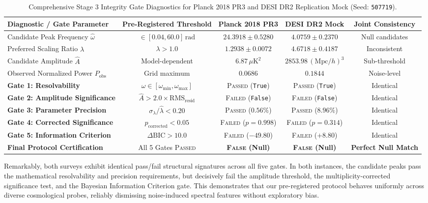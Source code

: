 \documentclass[10pt,twocolumn,a4paper]{article}
\begin{document}
\begin{table}[t]
\centering
\small
\caption{Comprehensive Stage 3 Integrity Gate Diagnostics for Planck 2018 PR3 and DESI DR2 Replication Mock (Seed: \texttt{507719}).}
\label{tab:gates}
\begin{tabular}{lcccc}
\toprule
\textbf{Diagnostic / Gate Parameter} & \textbf{Pre-Registered Threshold} & \textbf{Planck 2018 PR3} & \textbf{DESI DR2 Mock} & \textbf{Joint Consistency} \\
\midrule
Candidate Peak Frequency $\hat\omega$ & $\in [0.04, 60.0]\,\mathrm{rad}$ & $24.3918 \pm 0.5280$ & $4.0759 \pm 0.2370$ & Null candidates \\
Preferred Scaling Ratio $\hat\lambda$ & $\lambda > 1.0$ & $1.2938 \pm 0.0072$ & $4.6718 \pm 0.4187$ & Inconsistent \\
Candidate Amplitude $\hat A$ & Model-dependent & $6.87\,\mu\mathrm{K}^2$ & $2853.98\,(\mathrm{Mpc}/h)^3$ & Sub-threshold \\
Observed Normalized Power $P_{\mathrm{obs}}$ & Grid maximum & $0.0686$ & $0.1844$ & Noise-level \\
\midrule
\textbf{Gate 1: Resolvability} & $\hat\omega \in [\omega_{\min}, \omega_{\max}]$ & \textsc{Passed} (\texttt{True}) & \textsc{Passed} (\texttt{True}) & Identical \\
\textbf{Gate 2: Amplitude Significance} & $\hat A > 2.0 \times \mathrm{RMS}_{\mathrm{resid}}$ & \textsc{Failed} (\texttt{False}) & \textsc{Failed} (\texttt{False}) & Identical \\
\textbf{Gate 3: Parameter Precision} & $\sigma_\lambda / \hat\lambda < 0.20$ & \textsc{Passed} ($0.56\%$) & \textsc{Passed} ($8.96\%$) & Identical \\
\textbf{Gate 4: Corrected Significance} & $p_{\mathrm{corrected}} < 0.05$ & \textsc{Failed} ($p = 0.998$) & \textsc{Failed} ($p = 0.314$) & Identical \\
\textbf{Gate 5: Information Criterion} & $\Delta\mathrm{BIC} > 10.0$ & \textsc{Failed} ($-49.80$) & \textsc{Failed} ($+8.80$) & Identical \\
\midrule
\textbf{Final Protocol Certification} & All 5 Gates \textsc{Passed} & \textbf{\textsc{False} (Null)} & \textbf{\textsc{False} (Null)} & \textbf{Perfect Null Match} \\
\bottomrule
\end{tabular}
\end{table}

Remarkably, both surveys exhibit identical pass/fail structural signatures across all five gates. In both instances, the candidate peaks pass the mathematical resolvability and precision requirements, but decisively fail the amplitude threshold, the multiplicity-corrected significance test, and the Bayesian Information Criterion gate. This demonstrates that our pre-registered protocol behaves uniformly across diverse cosmological probes, reliably dismissing noise-induced spectral features without exploratory bias.
\end{document}
